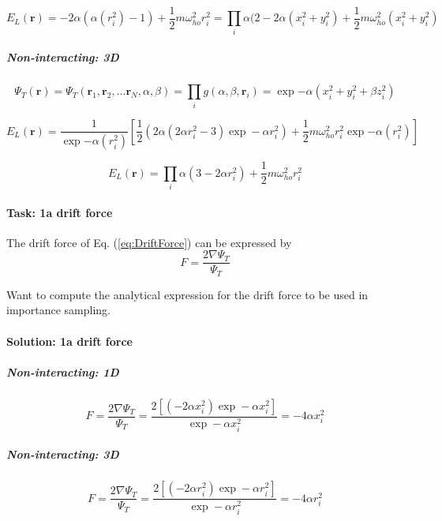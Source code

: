 \documentclass[oneside,onecolumn,9pt]{article}
\begin{document}
 \begin{equation}
    E_L(\mathbf{r})
    =  -2 \alpha (\alpha (r_i^2) -1) + \frac{1}{2}m\omega_{ho}^2r_i^2
    = \prod_i   \alpha (2-2\alpha (x_i^2+y_i^2) + \frac{1}{2}m\omega_{ho}^2(x_i^2+y_i^2)
\label{eq:LocalEN2D2}
\end{equation}


\subparagraph{Non-interacting: 3D}

\begin{equation}
 \Psi_T(\mathbf{r})=\Psi_T(\mathbf{r}_1, \mathbf{r}_2, \dots \mathbf{r}_N,\alpha,\beta)=\prod_i g(\alpha,\beta,\mathbf{r}_i) = \exp{-\alpha(x_i^2+y_i^2+\beta z_i^2)}
 \label{eq:TrialWfN3D}
 \end{equation}

 \begin{equation}
    E_L(\mathbf{r}) = \frac{1}{\exp{-\alpha(r_i^2)}} [ \frac{1}{2} (2 \alpha(2 \alpha r_i^2 -3) \exp -\alpha r_i^2) + \frac{1}{2}m\omega_{ho}^2r_i^2 \exp{-\alpha(r_i^2)}]
\label{eq:LocalEN3D}
\end{equation}

 \begin{equation}
    E_L(\mathbf{r}) = \prod_i  \alpha(3-2 \alpha r_i^2) + \frac{1}{2}m\omega_{ho}^2r_i^2
\label{eq:LocalEN3D2}
\end{equation}



\paragraph{Task: 1a drift force}
The drift force of Eq. (\ref{eq:DriftForce}) can be expressed by 
\begin{equation}
F = \frac{2\nabla \Psi_T}{\Psi_T}
\label{eq:DriftForce}
\end{equation}

Want to compute the analytical expression for the drift force to be used in importance sampling. 

\paragraph{Solution: 1a drift force}

\subparagraph{Non-interacting: 1D}

\begin{equation}
F = \frac{2\nabla \Psi_T}{\Psi_T}= \frac{2 [(-2 \alpha x_i^2) \exp-\alpha x_i^2]}{\exp-\alpha x_i^2} 
= -4 \alpha x_i^2
\label{eq:DriftForceN1D}
\end{equation}

\subparagraph{Non-interacting: 3D}

\begin{equation}
F = \frac{2\nabla \Psi_T}{\Psi_T}= \frac{2 [(-2 \alpha r_i^2) \exp-\alpha r_i^2]}{\exp-\alpha r_i^2} 
= -4 \alpha r_i^2
\label{eq:DriftForceN3D}
\end{equation}







\end{document}
